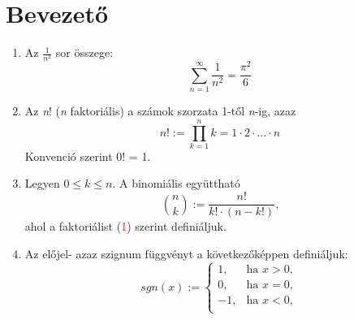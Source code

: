 \documentclass{article}
\begin{document}
\section{Bevezető}
\begin{enumerate}[label=\alph*)]
\item Az \(\frac{1}{n^2}\) sor összege:
\[\sum_{n=1}^\infty \frac{1}{n^2} = \frac{\pi^2}{6}\]
\item Az \textit{n}! (\textit{n} faktoriális) a számok szorzata 1-től \textit{n}-ig, azaz
\begin{equation}
n! := \prod_{k=1}^n k=1\cdot 2\cdot ...\cdot n\end{equation}
Konvenció szerint 0! = 1.
\item  Legyen \(0\leq k\leq n\). A binomiális együttható
\[\binom{n}{k}:=\frac{n!}{k!\cdot (n-k!)}\text{,}\]
ahol a faktoriálist (\textcolor{red}{1}) szerint definiáljuk.
\item Az előjel- azaz szignum függvényt a következőképpen definiáljuk:
\[sgn(x):=\begin{cases}
1, & \text{ha } x > 0, \\
0, & \text{ha } x = 0, \\
-1, & \text{ha } x < 0, \\
\end {cases}\]
\end{enumerate}
\pagebreak
\end{document}
